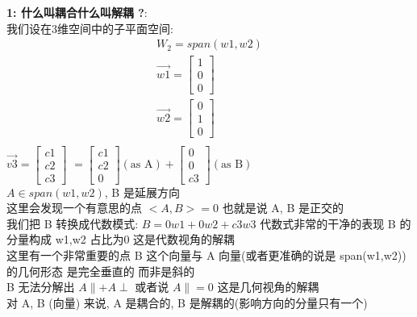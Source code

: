 \documentclass[12pt]{article}
\begin{document}
\begin{flushleft}
\begin{itemize}
        \textbf{1: 什么叫耦合什么叫解耦 ?}: \\
        我们设在3维空间中的子平面空间:
        \begin{align}
            W_{2} = span(w1,w2)       \\
            \vec{w1} = \begin{bmatrix}
                           1 \\
                           0 \\
                           0
                       \end{bmatrix} \\
            \vec{w2} = \begin{bmatrix}
                           0 \\
                           1 \\
                           0
                       \end{bmatrix} \\
        \end{align}
        $\vec{v3} = \begin{bmatrix}
                c1 \\
                c2 \\
                c3
            \end{bmatrix}$
        $ = \begin{bmatrix}
                c1 \\
                c2 \\
                0
            \end{bmatrix} (\text{as A}) + \begin{bmatrix}
                0 \\
                0 \\
                c3
            \end{bmatrix} (\text{as B})$ \\
        $A \in span(w1,w2)$, B 是延展方向 \\
        这里会发现一个有意思的点 $<A,B> = 0$ 也就是说 A, B 是正交的  \\
        我们把 B 转换成代数模式: $B = 0w1 + 0w2 + c3w3$ 代数式非常的干净的表现 B 的分量构成 w1,w2 占比为0 这是代数视角的解耦\\
        这里有一个非常重要的点 B 这个向量与 A 向量(或者更准确的说是 span(w1,w2)) 的几何形态 是完全垂直的 而非是斜的 \\
        B 无法分解出 $A \parallel + A\perp$ 或者说 $A \parallel = 0 $ 这是几何视角的解耦 \\
        对 A, B (向量) 来说, A 是耦合的, B 是解耦的(影响方向的分量只有一个) \\


\end{itemize}
\end{flushleft}
\end{document}
